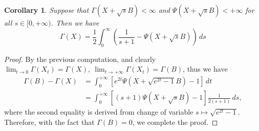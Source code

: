 \documentclass[10pt, reqno]{amsart}
\numberwithin{equation}{section}
\theoremstyle{definition}
\theoremstyle{plain}
\newtheorem{corollary}[definition]{Corollary}
\theoremstyle{remark}
\newcommand{\1}{\mathbbm{1}}
\begin{document}
	\begin{corollary}\label{cor:de bruijn_0^infty}
		Suppose that $\Gamma(X+\sqrt{s}B)<\infty$ and $ \Psi(X+\sqrt{s}B)<+\infty$ for all $s\in[0,+\infty)$. Then we have
		\begin{equation}\label{eq:de bruijn_0^infty}
			\Gamma(X)=\frac{1}{2} \int_0^\infty \left( \frac{1}{s+1}-\Psi(X+\sqrt{s}B) \right)\,ds
		\end{equation}
	\end{corollary}
	\begin{proof}
		By the previous computation, and clearly $\lim_{t\to 0}\Gamma(X_t)=\Gamma(X),\ \lim_{t\to+\infty}\Gamma(X_t)=\Gamma(B)$, thus we have
		\begin{align*}
			\Gamma(B)-\Gamma(X) &= \int_0^{+\infty} \left[e^{2t}\Psi\left(X+\sqrt{e^{2t}-1}B\right)-1 \right]\,dt\\
			&= \int_0^{+\infty} \left[ (s+1)\Psi(X+\sqrt{s}B)-1 \right]\frac{1}{2(s+1)}\,ds,
		\end{align*}
		where the second equality is derived from change of variable $s\mapsto \sqrt{e^{2t}-1}$. Therefore, with the fact that $\Gamma(B)=0$, we complete the proof.
	\end{proof}
\end{document}
